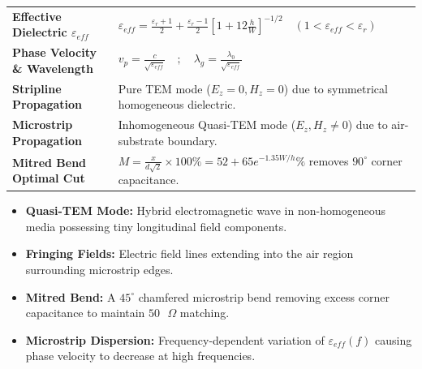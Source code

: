 \documentclass[10pt,a4paper]{article}
\begin{document}
\begin{tcolorbox}[formulabox, title={\textbf{Key Concepts and Metrics at a Glance}}]
\renewcommand{\arraystretch}{1.35}
\begin{tabularx}{\linewidth}{>{\raggedright\arraybackslash\bfseries}p{4.5cm} X}
Effective Dielectric $\varepsilon_{eff}$ & $\varepsilon_{eff} = \frac{\varepsilon_r+1}{2} + \frac{\varepsilon_r-1}{2} \left[1 + 12\frac{h}{W}\right]^{-1/2} \quad (1 < \varepsilon_{eff} < \varepsilon_r)$ \\[4pt]
Phase Velocity \& Wavelength & $v_p = \frac{c}{\sqrt{\varepsilon_{eff}}} \quad ; \quad \lambda_g = \frac{\lambda_0}{\sqrt{\varepsilon_{eff}}}$ \\[4pt]
Stripline Propagation & Pure TEM mode ($E_z=0, H_z=0$) due to symmetrical homogeneous dielectric. \\[4pt]
Microstrip Propagation & Inhomogeneous Quasi-TEM mode ($E_z, H_z \ne 0$) due to air-substrate boundary. \\[4pt]
Mitred Bend Optimal Cut & $M = \frac{x}{d\sqrt{2}} \times 100\% = 52 + 65 e^{-1.35 W/h}\%$ removes $90^\circ$ corner capacitance. \\
\end{tabularx}
\end{tcolorbox}

\begin{tcolorbox}[defbox, title={\textbf{One-Line Definitions}}]
  \begin{itemize}[leftmargin=*, noitemsep]
    \item \textbf{Quasi-TEM Mode:} Hybrid electromagnetic wave in non-homogeneous media possessing tiny longitudinal field components.
    \item \textbf{Fringing Fields:} Electric field lines extending into the air region surrounding microstrip edges.
    \item \textbf{Mitred Bend:} A $45^\circ$ chamfered microstrip bend removing excess corner capacitance to maintain $50\text{ }\Omega$ matching.
    \item \textbf{Microstrip Dispersion:} Frequency-dependent variation of $\varepsilon_{eff}(f)$ causing phase velocity to decrease at high frequencies.
  \end{itemize}
\end{tcolorbox}
\end{document}
